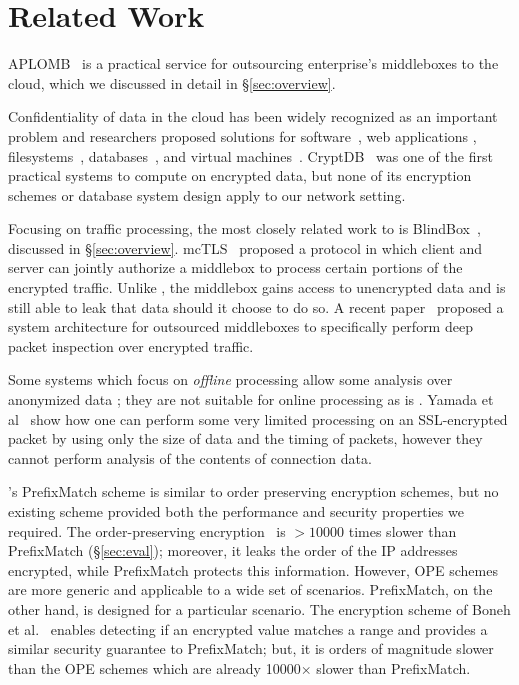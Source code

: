 
\section{Related Work}
\label{sec:related}

APLOMB~\cite{aplomb} is a practical service for outsourcing enterprise's middleboxes to the cloud, which we discussed in detail in \S\ref{sec:overview}.

Confidentiality of data in the cloud has been widely recognized as an important problem and researchers proposed solutions for software~\cite{Baumann:Haven}, web applications \cite{giffin:hails, Mylar},  filesystems~\cite{blaze:cfs, kallahalla:plutus, goh:sirius},  databases~\cite{popa:cryptdb, blindseer},  and virtual machines~\cite{Zhang:CloudVisor}. 
CryptDB~\cite{popa:cryptdb} was one of the first practical systems to compute on encrypted data, but none of its encryption schemes or database system design apply to our network setting. 

Focusing on traffic processing, the most closely related work to \sys is BlindBox~\cite{blindbox}, discussed in \S\ref{sec:overview}.  mcTLS~\cite{mctls} proposed a protocol in which client and server can jointly authorize a middlebox to process certain portions of the encrypted traffic. Unlike \sys, the middlebox  gains access to unencrypted data and is still able to leak that data should it choose to do so. A recent paper~\cite{secmb} proposed a system architecture for outsourced middleboxes to specifically perform deep packet inspection over encrypted traffic.

Some systems which focus on {\it offline} processing allow some analysis over anonymized data \cite{Vern:Anonymize06, Vern:Anonymize03}; they are not suitable for online processing as is \sys.
Yamada et al~\cite{Yamada_IDS} show how one can perform some very limited processing on an SSL-encrypted packet by using only the size of data and the timing of packets, however they cannot perform analysis of the contents of connection data.

\sys's PrefixMatch scheme is similar to order preserving encryption schemes, but no existing scheme provided both the performance and security properties we required.
The order-preserving encryption~\cite{boldyreva:ope, popa:mope}  is 
 $>10000$ times slower than PrefixMatch (\S\ref{sec:eval}); moreover, it leaks the order of the IP addresses encrypted, while PrefixMatch protects this information. However, OPE schemes are more generic and applicable to a wide set of scenarios. PrefixMatch, on the other hand, is designed for a particular scenario.
The encryption scheme of Boneh et al.~\cite{BonehRange} enables detecting if an encrypted value matches a range and provides a similar security guarantee to PrefixMatch; but, it is orders of magnitude slower than the OPE schemes which are already 10000$\times$ slower than PrefixMatch. 

